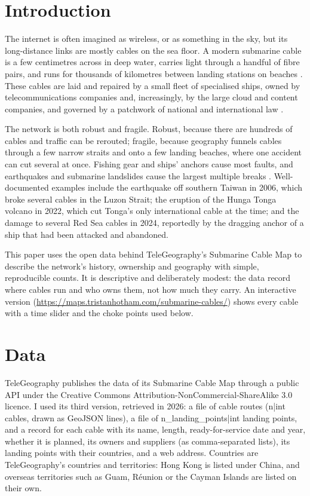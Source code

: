 \documentclass[11pt,a4paper]{article}
\begin{document}
\section{Introduction}
The internet is often imagined as wireless, or as something in the sky, but its long-distance links are mostly cables on the sea floor. A modern submarine cable is a few centimetres across in deep water, carries light through a handful of fibre pairs, and runs for thousands of kilometres between landing stations on beaches \citep{carter2009,starosielski2015}. These cables are laid and repaired by a small fleet of specialised ships, owned by telecommunications companies and, increasingly, by the large cloud and content companies, and governed by a patchwork of national and international law \citep{burnett2014}.

The network is both robust and fragile. Robust, because there are hundreds of cables and traffic can be rerouted; fragile, because geography funnels cables through a few narrow straits and onto a few landing beaches, where one accident can cut several at once. Fishing gear and ships' anchors cause most faults, and earthquakes and submarine landslides cause the largest multiple breaks \citep{carter2009}. Well-documented examples include the earthquake off southern Taiwan in 2006, which broke several cables in the Luzon Strait; the eruption of the Hunga Tonga volcano in 2022, which cut Tonga's only international cable at the time; and the damage to several Red Sea cables in 2024, reportedly by the dragging anchor of a ship that had been attacked and abandoned.

This paper uses the open data behind TeleGeography's Submarine Cable Map \citep{telegeography} to describe the network's history, ownership and geography with simple, reproducible counts. It is descriptive and deliberately modest: the data record where cables run and who owns them, not how much they carry. An interactive version (\url{https://maps.tristanhotham.com/submarine-cables/}) shows every cable with a time slider and the choke points used below.

\section{Data}
TeleGeography publishes the data of its Submarine Cable Map through a public API under the Creative Commons Attribution-NonCommercial-ShareAlike 3.0 licence. I used its third version, retrieved in 2026: a file of cable routes ({{n|int}} cables, drawn as GeoJSON lines), a file of {{n_landing_points|int}} landing points, and a record for each cable with its name, length, ready-for-service date and year, whether it is planned, its owners and suppliers (as comma-separated lists), its landing points with their countries, and a web address. Countries are TeleGeography's countries and territories: Hong Kong is listed under China, and overseas territories such as Guam, Réunion or the Cayman Islands are listed on their own.
\end{document}
